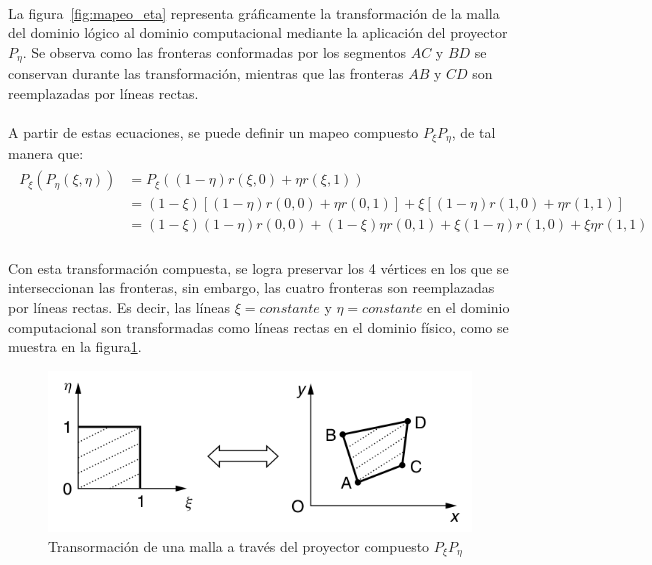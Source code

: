 \documentclass[letterpaper, openright, 12pt]{book}
\begin{document}
    \paragraph*{}
    La figura~\ref{fig:mapeo_eta} representa gráficamente la transformación
    de la malla del dominio lógico al dominio computacional mediante la
    aplicación del proyector $P_{\eta}$. Se observa como las fronteras
    conformadas por los segmentos $AC$ y $BD$ se conservan durante las
    transformación, mientras que las fronteras $AB$ y $CD$ son reemplazadas
    por líneas rectas.

    \paragraph*{}
    A partir de estas ecuaciones, se puede definir un mapeo compuesto
    $P_{\xi}P_{\eta}$, de tal manera que:
    \begin{align}
        \begin{aligned}
            P_{\xi}(P_{\eta}(\xi, \eta)) &= P_{\xi} ((1 - \eta)r(\xi, 0) + \eta r(\xi, 1)) \\
            &= (1 - \xi) \left[ (1 - \eta)r(0, 0) + \eta r(0, 1) \right] + \xi \left[ (1 - \eta)r(1, 0) + \eta r(1,1) \right]\\
            &= (1 - \xi)(1 - \eta)r(0, 0) + (1-\xi)\eta r(0, 1) + \xi(1 - \eta)r(1, 0) + \xi\eta r(1, 1)
        \end{aligned}
    \end{align}

    \paragraph*{}
    Con esta transformación compuesta, se logra preservar los 4 vértices en
    los que se interseccionan las fronteras, sin embargo, las cuatro
    fronteras son reemplazadas por líneas rectas. Es decir, las líneas
    $\xi = constante$ y $\eta = constante$ en el dominio computacional son
    transformadas como líneas rectas en el dominio físico, como se muestra
    en la figura\ref{fig:mapeo_xieta}.
    \begin{figure}[htbp!]
        \centering
        \includegraphics[keepaspectratio, width=120mm]{./Imagenes/mapeo_xieta}
        \caption[Transformación de malla por $P_{\xi}P_{\eta}$]{Transormación
        de una malla a través del proyector compuesto
        $P_{\xi}P_{\eta}$\cite{farrashkhalvat}}
        \label{fig:mapeo_xieta}
    \end{figure}
\end{document}
